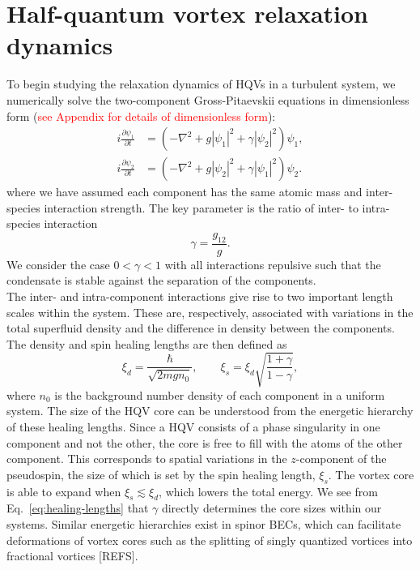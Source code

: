 \section{Half-quantum vortex relaxation dynamics}
To begin studying the relaxation dynamics of HQVs in a turbulent system, we
numerically solve the two-component Gross-Pitaevskii equations in dimensionless
form
(\textcolor{red}{see Appendix for details of dimensionless form}):
\begin{equation}
    \begin{aligned}
        i\frac{\partial \psi_1}{\partial t} &= (-\nabla^2 + g|\psi_1|^2
        + \gamma|\psi_2|^2)\psi_1, \\
        i\frac{\partial \psi_2}{\partial t} &= (-\nabla^2 + g|\psi_2|^2
        + \gamma|\psi_1|^2)\psi_2.
    \end{aligned}
    \label{eq:dimensionless-two-comp-GPEs}
\end{equation}
where we have assumed each component has the same atomic mass and inter-species
interaction strength.
The key parameter is the ratio of inter- to intra-species interaction
\begin{equation}
    \gamma = \frac{g_{12}}{g}.
\end{equation}
We consider the case $0 < \gamma < 1$ with all interactions repulsive such that
the condensate is stable against the separation of the components. \\
The inter- and intra-component interactions give rise to two important length
scales within the system.
These are, respectively, associated with variations in the total superfluid
density and the difference in density between the components.
The density and spin healing lengths are then defined as~\cite{Eto2011}
\begin{equation}
    \xi_d = \frac{\hbar}{\sqrt{2mgn_0}}, \qquad 
    \xi_s = \xi_d \sqrt{\frac{1 + \gamma}{1 - \gamma}},
    \label{eq:healing-lengths}
\end{equation}
where $n_0$ is the background number density of each component in a uniform
system.
The size of the HQV core can be understood from the energetic hierarchy of
these healing lengths.
Since a HQV consists of a phase singularity in one component and not the other,
the core is free to fill with the atoms of the other component.
This corresponds to spatial variations in the $z$-component of the pseudospin,
the size of which is set by the spin healing length, $\xi_s$.
The vortex core is able to expand when $\xi_s \lesssim \xi_d$, which lowers
the total energy.
We see from Eq.~\eqref{eq:healing-lengths} that $\gamma$ directly determines
the core sizes within our systems.
Similar energetic hierarchies exist in spinor BECs, which can facilitate
deformations of vortex cores such as the splitting of singly quantized vortices
into fractional vortices [REFS].

